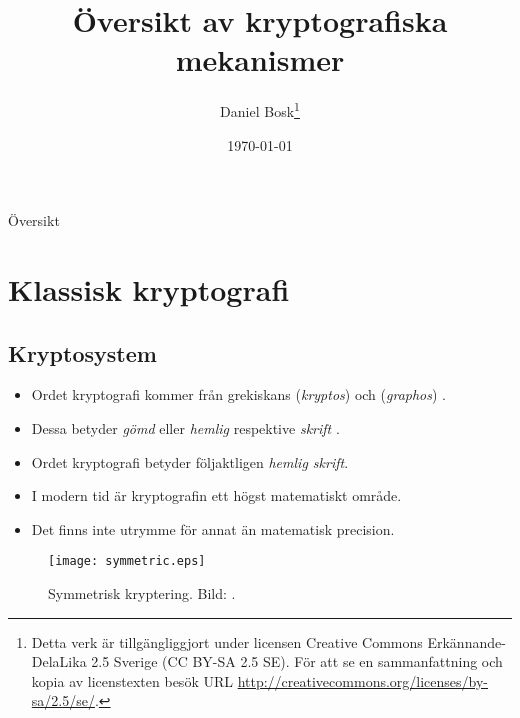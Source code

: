 \documentclass{beamer}
\title{%
  Översikt av kryptografiska mekanismer
}
\author{Daniel Bosk\footnote{%
  Detta verk är tillgängliggjort under licensen Creative Commons 
  Erkännande-DelaLika 2.5 Sverige (CC BY-SA 2.5 SE).
	För att se en sammanfattning och kopia av licenstexten besök URL 
	\url{http://creativecommons.org/licenses/by-sa/2.5/se/}.
}}
\institute[MIUN IKS]{%
  Avdelningen för informations- och kommunikationssytem,\\
  Mittuniversitetet, SE-851\,70 Sundsvall.
}
\date{\today}
\theoremstyle{definition}
\begin{document}
\begin{frame}
  \titlepage
\end{frame}

\begin{frame}{Översikt}
  \tableofcontents
\end{frame}





\section{Klassisk kryptografi}

\subsection{Kryptosystem}

\begin{frame}{\insertsubsectionhead}
  \begin{itemize}
    \item Ordet kryptografi kommer från grekiskans  
      (\emph{kryptos}) och  (\emph{graphos}) \cite{OED2013cg}.

    \item Dessa betyder \emph{gömd} eller \emph{hemlig} \cite{OED2013c} 
      respektive \emph{skrift} \cite{OED2013g}.

    \item Ordet kryptografi betyder följaktligen \emph{hemlig skrift}.

    \item I modern tid är kryptografin ett högst matematiskt område.

    \item Det finns inte utrymme för annat än matematisk precision.

  \end{itemize}
\end{frame}

\begin{frame}{\insertsubsectionhead}
  \begin{figure}
    \texttt{[image: symmetric.eps]}
    \caption{Symmetrisk kryptering.
    Bild: \cite{Stallings2011can}.}
  \end{figure}
\end{frame}
\end{document}
